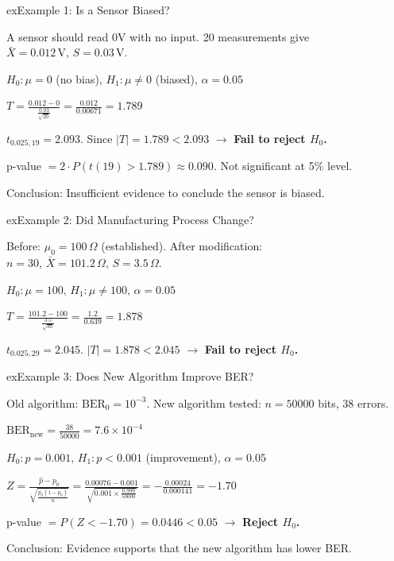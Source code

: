 
\begin{PSbox}[unbreakable]{ex}{Example 1: Is a Sensor Biased?}

A sensor should read 0V with no input. 20 measurements give $\bar{X} = 0.012\,\mathrm{V},\, S = 0.03\,\mathrm{V}$.

$H_{0}: \mu = 0$ (no bias), $H_{1}: \mu \ne 0$ (biased), $\alpha = 0.05$

$\displaystyle T = \frac{0.012 - 0}{\frac{0.03}{\sqrt{20}}} = \frac{0.012}{0.00671} = 1.789$

$t_{0.025, 19} = 2.093$. Since $\lvert T\rvert = 1.789 < 2.093$ \ensuremath{\to} \textbf{Fail to reject $H_{0}$.}

p-value $= 2 \cdot P(t(19) > 1.789) \approx 0.090$. Not significant at 5\% level.

Conclusion: Insufficient evidence to conclude the sensor is biased.

\end{PSbox}

\begin{PSbox}[unbreakable]{ex}{Example 2: Did Manufacturing Process Change?}

Before: $\mu_{0} = 100\,\Omega$ (established). After modification: $n = 30,\, \bar{X} = 101.2\,\Omega,\, S = 3.5\,\Omega$.

$H_{0}: \mu = 100,\, H_{1}: \mu \ne 100,\, \alpha = 0.05$

$\displaystyle T = \frac{101.2 - 100}{\frac{3.5}{\sqrt{30}}} = \frac{1.2}{0.639} = 1.878$

$t_{0.025, 29} = 2.045$. $\lvert T\rvert = 1.878 < 2.045$ \ensuremath{\to} \textbf{Fail to reject $H_{0}$.}

\end{PSbox}

\begin{PSbox}[unbreakable]{ex}{Example 3: Does New Algorithm Improve BER?}

Old algorithm: $\mathrm{BER}_{0} = 10^{-3}$. New algorithm tested: $n = 50000$ bits, 38 errors.

$\displaystyle \mathrm{BER}_{\mathrm{new}} = \frac{38}{50000} = 7.6 \times 10^{-4}$

$H_{0}: p = 0.001,\, H_{1}: p < 0.001$ (improvement), $\alpha = 0.05$

$\displaystyle Z = \frac{\hat{p} - p_{0}}{\sqrt{\frac{p_{0}(1-p_{0})}{n}}} = \frac{0.00076 - 0.001}{\sqrt{0.001 \times \frac{0.999}{50000}}} = -\frac{0.00024}{0.000141} = -1.70$

p-value $= P(Z < -1.70) = 0.0446 < 0.05$ \ensuremath{\to} \textbf{Reject $H_{0}$.}

Conclusion: Evidence supports that the new algorithm has lower BER.

\end{PSbox}

